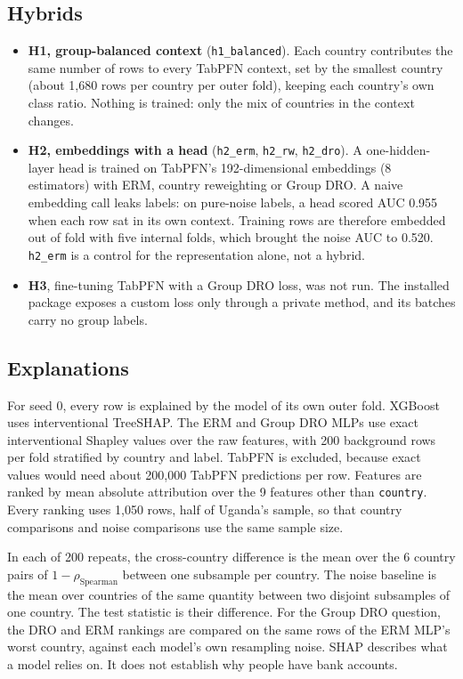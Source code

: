 \documentclass[11pt]{article}
\newcommand{\arm}[1]{\texttt{#1}}
\begin{document}
\subsection{Hybrids}

\begin{itemize}
  \item \textbf{H1, group-balanced context} (\arm{h1\_balanced}). Each country contributes the same number of rows to every TabPFN context, set by the smallest country (about 1,680 rows per country per outer fold), keeping each country's own class ratio. Nothing is trained: only the mix of countries in the context changes.
  \item \textbf{H2, embeddings with a head} (\arm{h2\_erm}, \arm{h2\_rw}, \arm{h2\_dro}). A one-hidden-layer head is trained on TabPFN's 192-dimensional embeddings (8 estimators) with ERM, country reweighting or Group DRO. A naive embedding call leaks labels: on pure-noise labels, a head scored AUC 0.955 when each row sat in its own context. Training rows are therefore embedded out of fold with five internal folds, which brought the noise AUC to 0.520. \arm{h2\_erm} is a control for the representation alone, not a hybrid.
  \item \textbf{H3}, fine-tuning TabPFN with a Group DRO loss, was not run. The installed package exposes a custom loss only through a private method, and its batches carry no group labels.
\end{itemize}

\subsection{Explanations}

For seed 0, every row is explained by the model of its own outer fold. XGBoost uses interventional TreeSHAP. The ERM and Group DRO MLPs use exact interventional Shapley values over the raw features, with 200 background rows per fold stratified by country and label. TabPFN is excluded, because exact values would need about 200,000 TabPFN predictions per row. Features are ranked by mean absolute attribution over the 9 features other than \texttt{country}. Every ranking uses 1,050 rows, half of Uganda's sample, so that country comparisons and noise comparisons use the same sample size.

In each of 200 repeats, the cross-country difference is the mean over the 6 country pairs of $1 - \rho_{\text{Spearman}}$ between one subsample per country. The noise baseline is the mean over countries of the same quantity between two disjoint subsamples of one country. The test statistic is their difference. For the Group DRO question, the DRO and ERM rankings are compared on the same rows of the ERM MLP's worst country, against each model's own resampling noise. SHAP describes what a model relies on. It does not establish why people have bank accounts.
\end{document}

